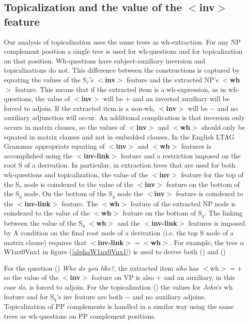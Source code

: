 \subsection{Topicalization and the value of the {\bf $<$inv$>$} feature}
Our analysis of topicalization uses the same trees as wh-extraction.
For any NP complement position a single tree is used for wh-questions
and for topicalization on that position. Wh-questions have
subject-auxiliary inversion and topicalizations do not.  This
difference between the constructions is captured by equating the
values of the S$_{r}$'s {\bf $<$inv$>$} feature and the extracted NP's
{\bf $<$wh$>$} feature.  This means that if the extracted item is a
wh-expression, as in wh-questions, the value of {\bf $<$inv$>$} will
be $+$ and an inverted auxiliary will be forced to adjoin. If the
extracted item is a non-wh, {\bf $<$inv$>$} will be $-$ and no
auxiliary adjunction will occur. An additional complication is that
inversion only occurs in matrix clauses, so the values of {\bf
$<$inv$>$} and {\bf $<$wh$>$} should only be equated in matrix clauses
and not in embedded clauses.  In the English LTAG Grammar appropriate
equating of {\bf $<$inv$>$} and {\bf $<$wh$>$} features is
accomplished using the {\bf $<$inv-link$>$} feature and a restriction
imposed on the root S of a derivation. In particular, in extraction
trees that are used for both wh-questions and topicalization, the
value of the {\bf $<$inv$>$} feature for the top of the S$_{r}$ node
is coindexed to the value of the {\bf $<$inv$>$} feature on the bottom
of the S$_{q}$ node.  On the bottom of the S$_{q}$ node the {\bf
$<$inv$>$} feature is coindexed to the {\bf $<$inv-link$>$} feature.
The {\bf $<$wh$>$} feature of the extracted NP node is coindexed to
the value of the {\bf $<$wh$>$} feature on the bottom of S$_{q}$. The
linking between the value of the S$_{q}$ {\bf $<$wh$>$} and the {\bf
$<$inv-link$>$} features is imposed by 
A condition on the final root node of a derivation (i.e. the top S
node of a matrix clause) requires that {\bf $<$inv-link$>=<$wh$>$}.
For example, the tree $\alpha$W1nx0Vnx1 in figure
(\ref{alphaW1nx0Vnx1}) is used to derive both () and ()



For the question () {\it Who do you like?}, the extracted item {\it who}
has $<$wh$>=+$  so the value of the {\bf $<$inv$>$} feature on VP is also $+$ and
an auxiliary, in this case {\it do}, is forced to adjoin.  For the topicalization () the values
for {\it John}`s wh feature and for S$_{q}$'s inv feature are both $-$ and no
auxiliary adjoins. Topicalization of PP complements is handled in a
similar way using the same trees as wh-questions on PP complement
positions. 





